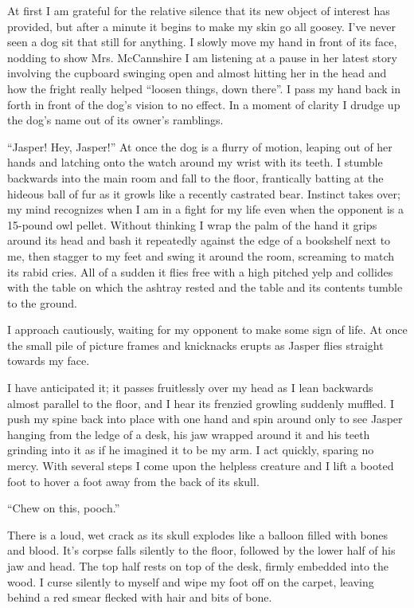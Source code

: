 At first I am grateful for the relative silence that its new object
of interest has provided, but after a minute it begins to make my
skin go all goosey. I've never seen a dog sit that still for
anything. I slowly move my hand in front of its face, nodding to
show Mrs. McCannshire I am listening at a pause in her latest story
involving the cupboard swinging open and almost hitting her in the
head and how the fright really helped ``loosen things, down there''.
I pass my hand back in forth in front of the dog's vision to no
effect. In a moment of clarity I drudge up the dog's name out of
its owner's ramblings.



``Jasper! Hey, Jasper!'' At once the dog is a flurry of motion,
leaping out of her hands and latching onto the watch around my
wrist with its teeth. I stumble backwards into the main room and
fall to the floor, frantically batting at the hideous ball of fur
as it growls like a recently castrated bear. Instinct takes over;
my mind recognizes when I am in a fight for my life even when the
opponent is a 15-pound owl pellet. Without thinking I wrap the palm
of the hand it grips around its head and bash it repeatedly against
the edge of a bookshelf next to me, then stagger to my feet and
swing it around the room, screaming to match its rabid cries. All
of a sudden it flies free with a high pitched yelp and collides
with the table on which the ashtray rested and the table and its
contents tumble to the ground.



I approach cautiously, waiting for my opponent to make some sign of
life. At once the small pile of picture frames and knicknacks
erupts as Jasper flies straight towards my face.



I have anticipated it; it passes fruitlessly over my head as I lean
backwards almost parallel to the floor, and I hear its frenzied
growling suddenly muffled. I push my spine back into place with one
hand and spin around only to see Jasper hanging from the ledge of a
desk, his jaw wrapped around it and his teeth grinding into it as
if he imagined it to be my arm. I act quickly, sparing no mercy.
With several steps I come upon the helpless creature and I lift a
booted foot to hover a foot away from the back of its skull.



``Chew on this, pooch.''



There is a loud, wet crack as its skull explodes like a balloon
filled with bones and blood. It's corpse falls silently to the
floor, followed by the lower half of his jaw and head. The top half
rests on top of the desk, firmly embedded into the wood. I curse
silently to myself and wipe my foot off on the carpet, leaving
behind a red smear flecked with hair and bits of bone.



